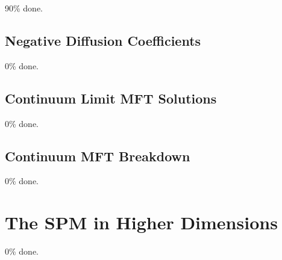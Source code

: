 90\% done.

\subsection{Negative Diffusion Coefficients}

0\% done.

\subsection{Continuum Limit MFT Solutions}

0\% done.

\subsection{Continuum MFT Breakdown}

0\% done.

\section{The SPM in Higher Dimensions}

0\% done.

